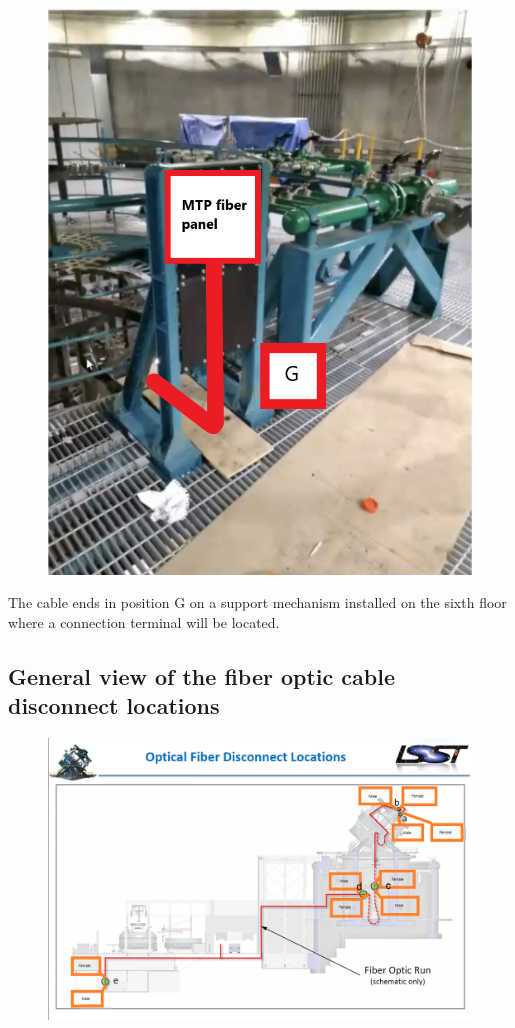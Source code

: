   \begin{figure}
    \centering
  \includegraphics[width=12cm]{images/21.png}
  \label{fig:jlsimon}
  \end{figure}

  The cable ends in position G on a support mechanism installed on the sixth floor where a connection terminal will be located.
\newpage

\subsection{General view of the fiber optic cable disconnect locations}
  
  \begin{figure}
  \includegraphics[width=\textwidth]{images/22.png}
  \label{fig:jlsimon}
  \end{figure}


